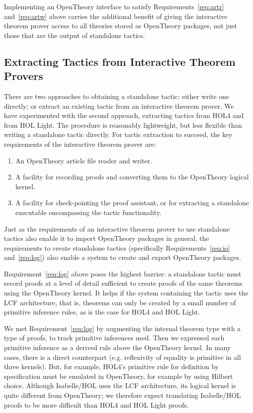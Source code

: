 \documentclass{llncs}
\newcommand{\OpenTheory}{OpenTheory\xspace}
\newcommand{\eg}{e.g.\xspace}
\begin{document}
Implementing an \OpenTheory interface to satisfy Requirements~\ref{req:artr} and~\ref{req:artw} above carries the additional benefit of giving the interactive theorem prover access to all theories stored as \OpenTheory packages, not just those that are the output of standalone tactics.

\subsection{Extracting Tactics from Interactive Theorem Provers}

There are two approaches to obtaining a standalone tactic: either write one directly; or extract an existing tactic from an interactive theorem prover.
We have experimented with the second approach, extracting tactics from HOL4 and from HOL Light.
The procedure is reasonably lightweight, but less flexible than writing a standalone tactic directly.
For tactic extraction to succeed, the key requirements of the interactive theorem prover are:
\begin{enumerate}
\item\label{req:io} An \OpenTheory article file reader and writer.

\item\label{req:log} A facility for recording proofs and converting them to the \OpenTheory logical kernel.

\item\label{req:ckpt} A facility for check-pointing the proof assistant, or for extracting a standalone executable encompassing the tactic functionality.
\end{enumerate}

Just as the requirements of an interactive theorem prover to use standalone tactics also enable it to import \OpenTheory packages in general, the requirements to create standalone tactics (specifically Requirements~\ref{req:io} and~\ref{req:log}) also enable a system to create and export \OpenTheory packages.

Requirement~\ref{req:log} above poses the highest barrier: a standalone tactic must record proofs at a level of detail sufficient to create proofs of the same theorems using the \OpenTheory kernel.
It helps if the system containing the tactic uses the LCF architecture, that is, theorems can only be created by a small number of primitive inference rules, as is the case for HOL4 and HOL Light.

We met Requirement~\ref{req:log} by augmenting the internal theorem type with a type of proofs, to track primitive inferences used.
Then we expressed each primitive inference as a derived rule above the \OpenTheory kernel.
In many cases, there is a direct counterpart (\eg reflexivity of equality is primitive in all three kernels).
But, for example, HOL4's primitive rule for definition by specification must be emulated in \OpenTheory, for example by using Hilbert choice.
Although Isabelle/HOL uses the LCF architecture, its logical kernel is quite different from \OpenTheory; we therefore expect translating Isabelle/HOL proofs to be more difficult than HOL4 and HOL Light proofs.
\end{document}
